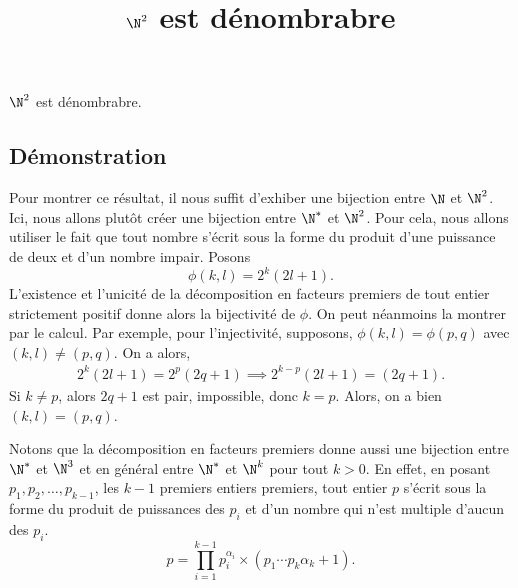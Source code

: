 \documentclass[fontsize=12pt,twoside=false,parskip=half]{scrartcl}
\title{$\N^2$ est dénombrabre}
\date{}
\author{}
\begin{document}
\maketitle
   \begin{Theoreme}
      $\N^2$ est dénombrabre.
   \end{Theoreme}
   \subsection{Démonstration}
      Pour montrer ce résultat, il nous suffit d’exhiber une bijection entre $\N$ et $\N^2$. Ici, nous 
      allons plutôt créer une bijection entre $\N^*$ et $\N^2$. Pour cela, nous allons utiliser le fait
      que tout nombre s’écrit sous la forme du produit d’une puissance de deux et d’un nombre impair. Posons 
      \[
         \phi(k, l) = 2^k(2l + 1).
      \]
      L’existence et l’unicité de la décomposition en facteurs premiers de tout entier strictement positif
      donne alors la bijectivité de $\phi$. On peut néanmoins la montrer par le calcul. Par exemple, pour
      l’injectivité, supposons, $\phi(k, l) = \phi(p, q)$ avec $(k, l) \neq (p, q)$. On a alors, 
      \begin{align*}
         2^k(2l + 1) = 2^p(2q + 1) \implies 2^{k - p}(2l + 1) = (2q + 1).
      \end{align*}
      Si $k \neq p$, alors $2q + 1$ est pair, impossible, donc $k = p$. Alors, on a bien $(k, l) = (p, q)$. 

      Notons que la décomposition en facteurs premiers donne aussi une bijection entre $\N^*$ et $\N^3$ et 
      en général entre $\N^*$ et $\N^k$ pour tout $k > 0$. En effet, en posant $p_1,p_2, \ldots, p_{k - 1}$, les $k - 1$
      premiers entiers premiers, tout entier $p$ s’écrit sous la forme du produit de puissances des $p_i$ et d’un 
      nombre qui n’est multiple d’aucun des $p_i$.
      \[
         p = \prod_{i = 1}^{k - 1} p_i^{\alpha_i} \times (p_1\cdots p_k \alpha_k + 1).
      \]
\end{document}
